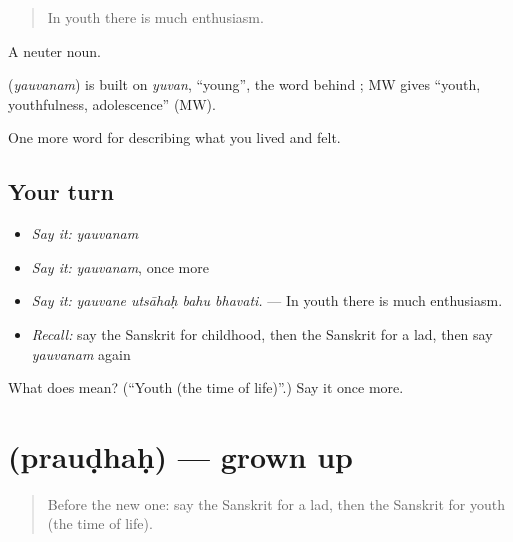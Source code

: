 \begin{quote}
In youth there is much enthusiasm.
\end{quote}

A neuter noun.

\begin{cousinweb}
\textbf{} (\emph{yauvanam}) is built on \emph{yuvan}, \textquotedblleft{}young\textquotedblright{}, the word behind \textbf{}; MW gives \textquotedblleft{}youth, youthfulness, adolescence\textquotedblright{} (MW).
\end{cousinweb}

\begin{grammarlens}[title={What you've built}]
One more word for describing what you lived and felt.
\end{grammarlens}

\subsection*{Your turn}
\begin{itemize}
\raggedright
  \item \emph{Say it:} \emph{yauvanam}
  \item \emph{Say it:} \emph{yauvanam}, once more
  \item \emph{Say it:} \emph{yauvane utsāhaḥ bahu bhavati.} — In youth there is much enthusiasm.
  \item \emph{Recall:} say the Sanskrit for childhood, then the Sanskrit for a lad, then say \emph{yauvanam} again
\end{itemize}

\begin{tcolorbox}[breakable,colback=teal!4,colframe=teal!35!black,title={Before you move on}]
What does  mean? (\textquotedblleft{}Youth (the time of life)\textquotedblright{}.) Say it once more.
\end{tcolorbox}
\section[\texorpdfstring{\sk{प्रौढः} (prauḍhaḥ)}{प्रौढः (prauḍhaḥ)}]{ (prauḍhaḥ) — grown up}

\label{lesson:SA-C495-praudhah}



\begin{quote}
Before the new one: say the Sanskrit for a lad, then the Sanskrit for youth (the time of life).
\end{quote}

